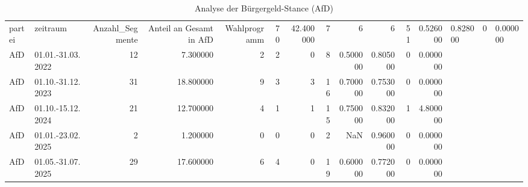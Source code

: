 \begin{table}
\caption{Analyse der Bürgergeld-Stance (AfD)}
\label{tab:meine_tabelle}
\begin{tabular}{llrrrrrrrrrr}
\toprule
partei & zeitraum & Anzahl_Segmente & Anteil an Gesamt in %
\midrule
AfD & Wahlprogramm & 70 & 42.400000 & 7 & 6 & 6 & 51 & 0.526000 & 0.828000 & 0 & 0.000000 \\
AfD & 01.01.-31.03.2022 & 12 & 7.300000 & 2 & 2 & 0 & 8 & 0.500000 & 0.805000 & 0 & 0.000000 \\
AfD & 01.10.-31.12.2023 & 31 & 18.800000 & 9 & 3 & 3 & 16 & 0.700000 & 0.753000 & 0 & 0.000000 \\
AfD & 01.10.-15.12.2024 & 21 & 12.700000 & 4 & 1 & 1 & 15 & 0.750000 & 0.832000 & 1 & 4.800000 \\
AfD & 01.01.-23.02.2025 & 2 & 1.200000 & 0 & 0 & 0 & 2 & NaN & 0.960000 & 0 & 0.000000 \\
AfD & 01.05.-31.07.2025 & 29 & 17.600000 & 6 & 4 & 0 & 19 & 0.600000 & 0.772000 & 0 & 0.000000 \\
\bottomrule
\end{tabular}
\end{table}
